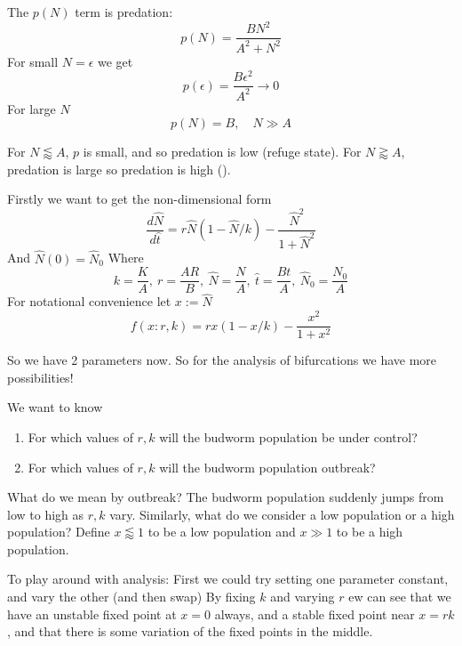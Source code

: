 \documentclass{X:/Documents/Coding/Latex/myassignment}
\begin{document}
The $p(N)$ term is predation:
\[p(N) = \frac{BN^2}{A^2 + N^2}\]
For small $N = \epsilon$ we get
\[p(\epsilon) = \frac{B\epsilon^2}{A^2} \to 0\]
For large $N$
\[p(N) = B, \quad N\gg A\]

For $N \lessapprox  A$, $p$ is small, and so predation is low (refuge state). For $N \gtrapprox  A$, predation is large so predation is high ().



Firstly we want to get the non-dimensional form
\[\frac{d\hat{N}}{d\hat{t}} = r\hat{N} \left(1- \hat{N}/k\right) - \frac{\hat{N}^2}{1+\hat{N}^2}\]
And $\hat{N}(0) = \hat{N}_0$
Where
\[k = \frac KA,\ r = \frac{AR}{B},\ \hat{N} = \frac NA,\ \hat{t} = \frac{Bt}{A},\ \hat{N}_0 = \frac{N_0}A\]
For notational convenience let $x := \hat{N}$ 
\[f(x:r,k) = rx (1-x/k) - \frac{x^2}{1+x^2}\]


So we have 2 parameters now. So for the analysis of bifurcations we have more possibilities!

We want to know 
\begin{enumerate}
    \item For which values of $r,k$ will the budworm population be under control?
    \item For which values of $r,k$ will the budworm population outbreak?
\end{enumerate}
What do we mean by outbreak? The budworm population suddenly jumps from low to high as $r,k$ vary.
Similarly, what do we consider a low population or a high population? 
Define $x\lessapprox 1$ to be a low population and $x \gg 1$ to be a high population.

To play around with analysis:
First we could try setting one parameter constant, and vary the other (and then swap)
By fixing $k$ and varying $r$ ew can see that we have an unstable fixed point at $x=0$ always, and a stable fixed point near $x =rk$, and that there is some variation of the fixed points in the middle.

\end{document}
